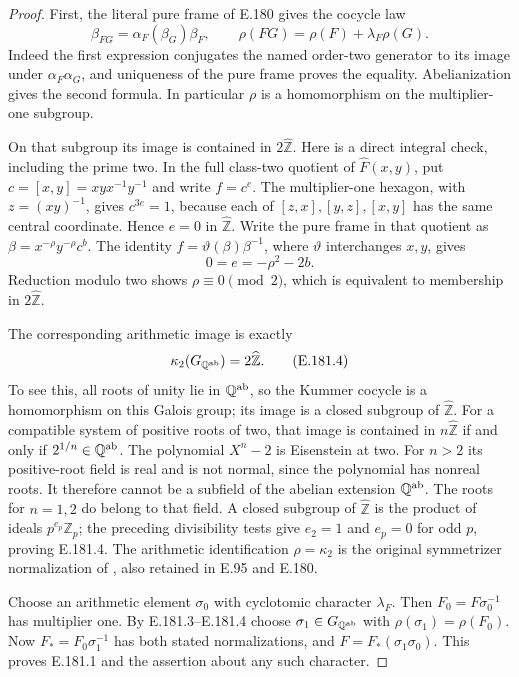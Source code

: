 \begin{proof}
First, the literal pure frame of E.180 gives the cocycle law
\[
 \beta_{FG}=\alpha_F(\beta_G)\beta_F,
 \qquad \rho(FG)=\rho(F)+\lambda_F\rho(G).
\tag{E.181.2}
\]
Indeed the first expression conjugates the named order-two
generator to its image under \(\alpha_F\alpha_G\), and uniqueness
of the pure frame proves the equality.  Abelianization gives the
second formula.  In particular \(\rho\) is a homomorphism on the
multiplier-one subgroup.

On that subgroup its image is contained in
\(2\widehat{\mathbb Z}\).  Here is a direct integral check,
including the prime two.  In the full class-two quotient of
\(\widehat F(x,y)\), put \(c=[x,y]=xyx^{-1}y^{-1}\) and write
\(f=c^e\).  The multiplier-one hexagon, with
\(z=(xy)^{-1}\), gives \(c^{3e}=1\), because each of
\([z,x],[y,z],[x,y]\) has the same central coordinate.
Hence \(e=0\) in \(\widehat{\mathbb Z}\).
Write the pure frame in that quotient as
\(\beta=x^{-\rho}y^{-\rho}c^b\).
The identity \(f=\vartheta(\beta)\beta^{-1}\), where
\(\vartheta\) interchanges \(x,y\), gives
\[
                        0=e=-\rho^2-2b.
\tag{E.181.3}
\]
Reduction modulo two shows \(\rho\equiv0\pmod2\), which is
equivalent to membership in \(2\widehat{\mathbb Z}\).

The corresponding arithmetic image is exactly
\[
             \kappa_2(G_{\mathbb Q^{\rm ab}})
                         =2\widehat{\mathbb Z}.
\tag{E.181.4}
\]
To see this, all roots of unity lie in \(\mathbb Q^{\rm ab}\),
so the Kummer cocycle is a homomorphism on this Galois group;
its image is a closed subgroup of \(\widehat{\mathbb Z}\).
For a compatible system of positive roots of two, that image
is contained in \(n\widehat{\mathbb Z}\) if and only if
\(2^{1/n}\in\mathbb Q^{\rm ab}\).
The polynomial \(X^n-2\) is Eisenstein at two.
For \(n>2\) its positive-root field is real and is not normal,
since the polynomial has nonreal roots.  It therefore cannot
be a subfield of the abelian extension \(\mathbb Q^{\rm ab}\).
The roots for \(n=1,2\) do belong to that field.  A closed
subgroup of \(\widehat{\mathbb Z}\) is the product of ideals
\(p^{e_p}\mathbb Z_p\); the preceding divisibility tests give
\(e_2=1\) and \(e_p=0\) for odd \(p\), proving E.181.4.
The arithmetic identification \(\rho=\kappa_2\) is the original
symmetrizer normalization of
\citet[Definition 5.1, author p.17]{SymNakamuraSchneps2000},
also retained in E.95 and E.180.

Choose an arithmetic element \(\sigma_0\) with cyclotomic
character \(\lambda_F\).  Then \(F_0=F\sigma_0^{-1}\) has
multiplier one.  By E.181.3--E.181.4 choose
\(\sigma_1\in G_{\mathbb Q^{\rm ab}}\) with
\(\rho(\sigma_1)=\rho(F_0)\).
Now \(F_*=F_0\sigma_1^{-1}\) has both stated normalizations,
and \(F=F_*(\sigma_1\sigma_0)\).
This proves E.181.1 and the assertion about any such character.


\end{proof}
